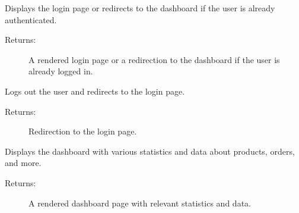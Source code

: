 \documentclass[letterpaper,10pt,english]{sphinxmanual}
\begin{document}
\begin{fulllineitems}
\label{\detokenize{modules/views:Dashboard.views.LoginPage}}
\sphinxAtStartPar
Displays the login page or redirects to the dashboard if the user is already authenticated.
\begin{description}
\item[{Returns:}] \leavevmode
\sphinxAtStartPar
A rendered login page or a redirection to the dashboard if the user is already logged in.

\end{description}

\end{fulllineitems}


\begin{fulllineitems}
\label{\detokenize{modules/views:Dashboard.views.LogoutPage}}
\sphinxAtStartPar
Logs out the user and redirects to the login page.
\begin{description}
\item[{Returns:}] \leavevmode
\sphinxAtStartPar
Redirection to the login page.

\end{description}

\end{fulllineitems}


\begin{fulllineitems}
\label{\detokenize{modules/views:Dashboard.views.dashboard}}
\sphinxAtStartPar
Displays the dashboard with various statistics and data about products, orders, and more.
\begin{description}
\item[{Returns:}] \leavevmode
\sphinxAtStartPar
A rendered dashboard page with relevant statistics and data.

\end{description}

\end{fulllineitems}
\end{document}
